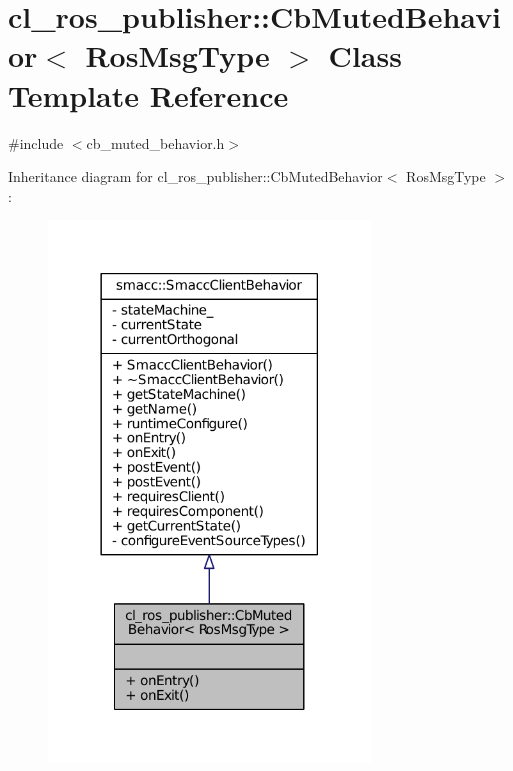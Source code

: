 \hypertarget{classcl__ros__publisher_1_1CbMutedBehavior}{}\section{cl\+\_\+ros\+\_\+publisher\+:\+:Cb\+Muted\+Behavior$<$ Ros\+Msg\+Type $>$ Class Template Reference}
\label{classcl__ros__publisher_1_1CbMutedBehavior}


{\ttfamily \#include $<$cb\+\_\+muted\+\_\+behavior.\+h$>$}



Inheritance diagram for cl\+\_\+ros\+\_\+publisher\+:\+:Cb\+Muted\+Behavior$<$ Ros\+Msg\+Type $>$\+:
\nopagebreak
\begin{figure}[H]
\begin{center}
\leavevmode
\includegraphics[width=242pt]{classcl__ros__publisher_1_1CbMutedBehavior__inherit__graph}
\end{center}
\end{figure}


